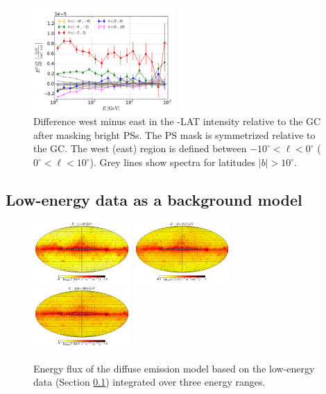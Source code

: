 \begin{figure}[h]
\hspace{-2mm}
 \includegraphics[width=0.48\textwidth]{plots/Difference_data_for_different_latitudes.pdf}
 \caption{Difference west minus east in the \Fermi-LAT intensity relative to the GC after masking bright PSs.
 The PS mask is symmetrized relative to the GC.
 The west (east) region is defined between $-10^\circ < \ell <0^\circ$ ($0^\circ < \ell <10^\circ$).
 Grey lines show spectra for latitudes $|b| > 10^\circ$. 
 }
 \label{fig:data_diff}
\end{figure}

\subsection{Low-energy data as a background model}
\label{sec:le_data_model}

\begin{figure}[t]
\includegraphics[width=0.33\textwidth]{plots/Mollweide_LowE_model_0p3-1p0GeV_flux_source_range_0_log.pdf}
\includegraphics[width=0.33\textwidth]{plots/Mollweide_LowE_model_0p3-1p0GeV_flux_source_range_1_log.pdf}
\includegraphics[width=0.33\textwidth]{plots/Mollweide_LowE_model_0p3-1p0GeV_flux_source_range_2_log.pdf}
\caption{Energy flux of the diffuse emission model based on the low-energy data (Section \ref{sec:le_data_model})
integrated over three energy ranges. }
\label{fig:Maps_lowE_model}
\end{figure}


